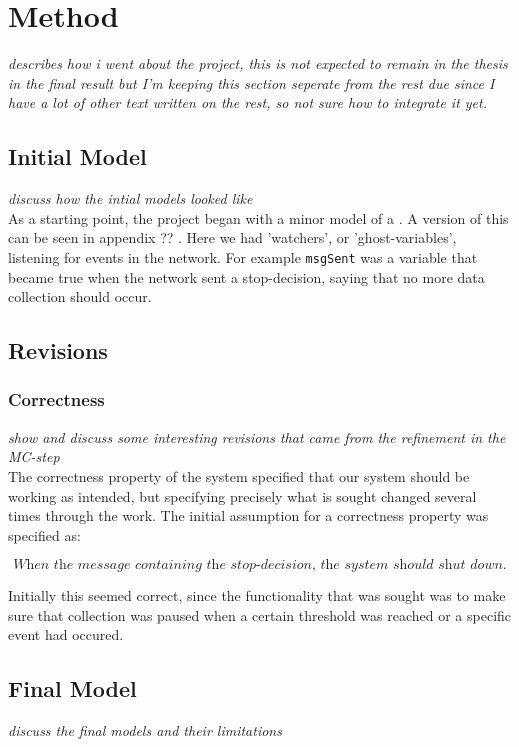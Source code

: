 \chapter{Method}

\textit{describes how i went about the project, this is not expected to remain in the thesis in the final result but I'm keeping this section seperate from the rest due since I have a lot of other text written on the rest, so not sure how to integrate it yet.}

\section{Initial Model}

\textit{discuss how the intial models looked like} \\

As a starting point, the project began with a minor model of a \wsn. A version of this can be seen in appendix ?? . Here we had 'watchers', or 'ghost-variables', listening for events in the network. For example \texttt{msgSent} was a variable that became true when the network sent a stop-decision, saying that no more data collection should occur.

\section{Revisions}

\subsection{Correctness}

\textit{show and discuss some interesting revisions that came from the refinement in the MC-step} \\

The correctness property of the system specified that our system should be working as intended, but specifying precisely what is sought changed several times through the work. The initial assumption for a correctness property was specified as: 

\[ \textit{When the message containing the stop-decision, the system should shut down.} \]

Initially this seemed correct, since the functionality that was sought was to make sure that collection was paused when a certain threshold was reached or a specific event had occured.

\section{Final Model}

\textit{discuss the final models and their limitations}
